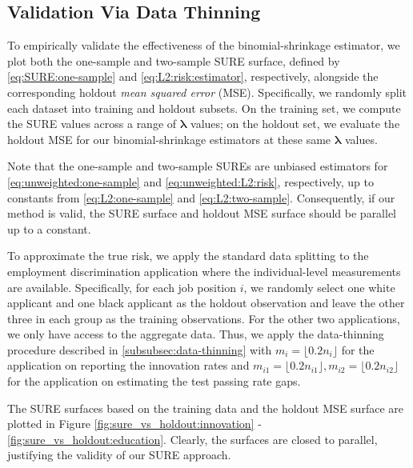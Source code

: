 \documentclass[12pt,letterpaper]{article}
\newcommand{\R}{\mathbb{R}}
\begin{document}
\subsection{Validation Via Data Thinning}
To empirically validate the effectiveness of the binomial-shrinkage estimator, we plot both the one-sample and two-sample SURE surface, defined by \eqref{eq:SURE:one-sample} and \eqref{eq:L2:risk:estimator}, respectively, alongside the corresponding holdout \textit{mean squared error} (MSE). Specifically, we randomly split each dataset into training and holdout subsets. On the training set, we compute the SURE values across a range of $\boldsymbol{\lambda}$ values; on the holdout set, we evaluate the holdout MSE for our binomial-shrinkage estimators at these same $\boldsymbol{\lambda}$ values.

Note that the one-sample and two-sample SUREs are unbiased estimators for \eqref{eq:unweighted:one-sample} and \eqref{eq:unweighted:L2:risk}, respectively, up to constants from \eqref{eq:L2:one-sample} and \eqref{eq:L2:two-sample}. Consequently, if our method is valid, the SURE surface and holdout MSE surface should be parallel up to a constant. 

To approximate the true risk, we apply the standard data splitting to the employment discrimination application where the individual-level measurements are available. Specifically, for each job position $i$, we randomly select one white applicant and one black applicant as the holdout observation and leave the other three in each group as the training observations. For the other two applications, we only have access to the aggregate data. Thus, we apply the data-thinning procedure described in \ref{subsubsec:data-thinning} with $m_i=\lfloor 0.2n_i\rfloor$ for the application on reporting the innovation rates and $m_{i1}=\lfloor 0.2n_{i1}\rfloor, m_{i2}=\lfloor 0.2n_{i2}\rfloor$ for the application on estimating the test passing rate gaps.

The SURE surfaces based on the training data and the holdout MSE surface are plotted in Figure \ref{fig:sure_vs_holdout:innovation} - \ref{fig:sure_vs_holdout:education}. Clearly, the surfaces are closed to parallel, justifying the validity of our SURE approach.


\end{document}
